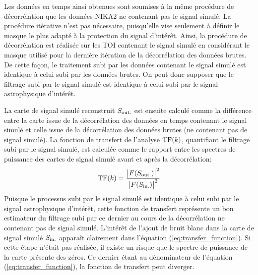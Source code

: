 Les données en temps ainsi obtenues sont soumises à la même procédure de décorrélation que les données NIKA2 ne contenant pas le signal simulé.
La procédure itérative n'est pas nécessaire, puisqu'elle vise seulement à définir le masque le plus adapté à la protection du signal d'intérêt.
Ainsi, la procédure de décorrélation est réalisée sur les TOI contenant le signal simulé en considérant le masque utilisé pour la dernière itération de la décorrélation des données brutes.
De cette façon, le traitement subi par les données contenant le signal simulé est identique à celui subi par les données brutes.
On peut donc supposer que le filtrage subi par le signal simulé est identique à celui subi par le signal astrophysique d'intérêt.

La carte de signal simulé reconstruit $S_{\rm out.}$ est ensuite calculé comme la différence entre la carte issue de la décorrélation des données en temps contenant le signal simulé et celle issue de la décorrélation des données brutes (ne contenant pas de signal simulé).
La fonction de transfert de l'analyse ${\rm TF}(k)$, quantifiant le filtrage subi par le signal simulé, est calculée comme le rapport entre les spectres de puissance des cartes de signal simulé avant et après la décorrélation:
\begin{equation}
    \label{eq:transfer_function}
    {\rm TF}(k) = \frac{\big| F(S_{\rm out.}) \big|^2}{\big| F(S_{\rm in.}) \big|^2}
\end{equation}
Puisque le processus subi par le signal simulé est identique à celui subi par le signal astrophysique d'intérêt, cette fonction de transfert représente un bon estimateur du filtrage subi par ce dernier au cours de la décorrélation ne contenant pas de signal simulé.
L'intérêt de l'ajout de bruit blanc dans la carte de signal simulé $S_{\rm in.}$ apparaît clairement dans l'équation (\ref{eq:transfer_function}).
Si cette étape n'était pas réalisée, il existe un risque que le spectre de puissance de la carte présente des zéros.
Ce dernier étant au dénominateur de l'équation (\ref{eq:transfer_function}), la fonction de transfert peut diverger.

